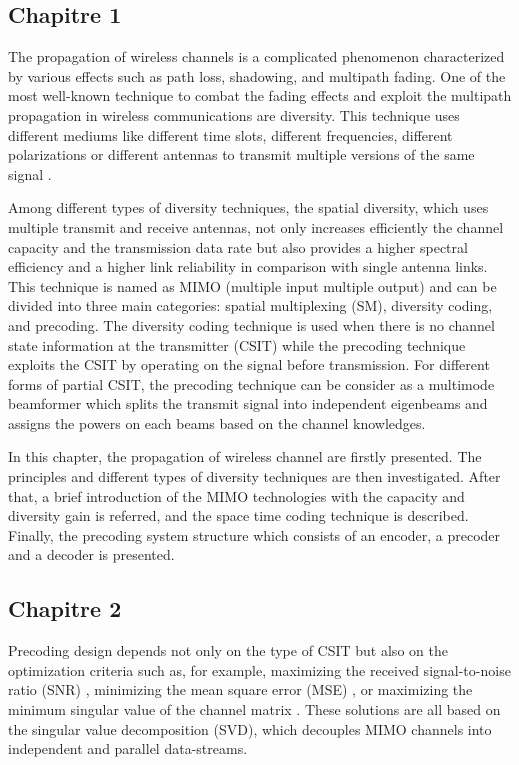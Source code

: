 \subsection*{Chapitre 1}
The propagation of wireless channels is a complicated phenomenon characterized by various effects such as path loss, shadowing, and multipath fading. One of the most well-known technique to combat the fading effects and exploit the multipath propagation in wireless communications are diversity. This technique uses different mediums like different time slots, different frequencies, different polarizations or different antennas to transmit multiple versions of the same signal \cite{guey1999signal}. 

Among different types of diversity techniques, the spatial diversity, which uses multiple transmit and receive antennas, not only increases efficiently the channel capacity and the transmission data rate but also provides a higher spectral efficiency and a higher link reliability in comparison with single antenna links. This technique is named as MIMO (multiple input multiple output) and can be divided into three main categories: spatial multiplexing (SM), diversity coding, and precoding. The diversity coding technique is used when there is no channel state information at the transmitter (CSIT) while the precoding technique exploits the CSIT by operating on the signal before transmission. For different forms of partial CSIT, the precoding technique  can be consider as a multimode beamformer which splits the transmit signal into independent eigenbeams and assigns the powers on each beams based on the channel knowledges.

In this chapter, the propagation of wireless channel are firstly presented. The principles and different types of diversity techniques are then investigated. After that, a brief introduction of the MIMO technologies with the capacity and diversity gain is referred, and the space time coding technique is described. Finally, the precoding system structure which consists of an encoder, a precoder and a decoder is presented.

\subsection*{Chapitre 2}
Precoding design depends not only on the type of CSIT but also on the optimization criteria such as, for example, maximizing the received signal-to-noise ratio (SNR) \cite{stoica2002mss}, minimizing the mean square error (MSE) \cite{sampath2001glp}, or maximizing the minimum singular value of the channel matrix \cite{scaglione2002ods}. These solutions are all based on the singular value decomposition (SVD), which decouples MIMO channels into independent and parallel data-streams. 

